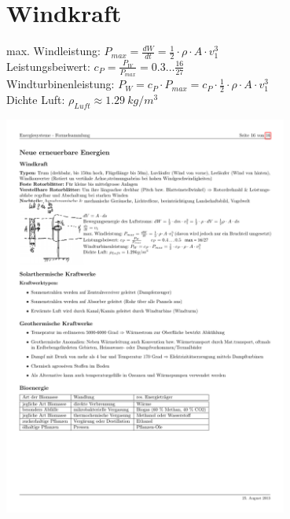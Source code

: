 \section{Windkraft}
\begin{minipage}[lt]{10cm}
	max. Windleistung: $P_{max} = \frac{dW}{dt} = \frac{1}{2} \cdot \rho \cdot A \cdot v_1^3$\\
	Leistungsbeiwert: $c_P = \frac{P_W}{P_{max}} = 0.3 \dots \frac{16}{27}$\\
	Windturbinenleistung: $P_W = c_P \cdot P_{max} = c_P \cdot \frac{1}{2} \cdot \rho \cdot A \cdot v_1^3$\\
	Dichte Luft: $\rho_{Luft} \approx 1.29~kg/m^3$
\end{minipage}
\begin{minipage}[rt]{5cm}
	\includegraphics[width=0.7\textwidth]{./images/Wind.pdf}
\end{minipage}
	
		